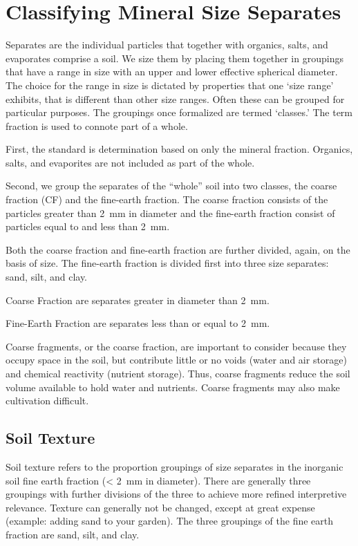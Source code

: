 \documentclass[letterpaper, 12pt]{article}
\begin{document}
\section{Classifying Mineral Size Separates}
    
Separates are the individual particles that together with organics, salts, and evaporates comprise a soil. We size them by placing them together in groupings that have a range in size with an upper and lower effective spherical diameter. The choice for the range in size is dictated by properties that one ‘size range’ exhibits, that is different than other size ranges. Often these can be grouped for particular purposes. The groupings once formalized are termed ‘classes.’ The term fraction is used to connote part of a whole.
    
First, the standard is determination based on only the mineral fraction. Organics, salts, and evaporites are not included as part of the whole.
    
Second, we group the separates of the “whole” soil into two classes, the coarse fraction (CF) and the fine-earth fraction. The coarse fraction consists of the particles greater than \qty{2}{mm} in diameter and the fine-earth fraction consist of particles equal to and less than \qty{2}{mm}.
    
Both the coarse fraction and fine-earth fraction are further divided, again, on the basis of size. The fine-earth fraction is divided first into three size separates: sand, silt, and clay.
    
Coarse Fraction are separates greater in diameter than \qty{2}{mm}.
    
Fine-Earth Fraction are separates less than or equal to \qty{2}{mm}.
    
Coarse fragments, or the coarse fraction, are important to consider because they occupy space in the soil, but contribute little or no voids (water and air storage) and chemical reactivity (nutrient storage). Thus, coarse fragments reduce the soil volume available to hold water and nutrients. Coarse fragments may also make cultivation difficult.

\subsection{Soil Texture}
    
Soil texture refers to the proportion groupings of size separates in the inorganic soil fine earth fraction (\qty{< 2}{mm} in diameter). There are generally three groupings with further divisions of the three to achieve more refined interpretive relevance. Texture can generally not be changed, except at great expense (example: adding sand to your garden). The three groupings of the fine earth fraction are sand, silt, and clay.
    
\end{document}
